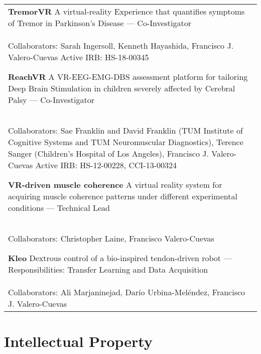 \documentclass[10pt,a4paper]{article}
\begin{document}
  \vspace*{1mm}
  \begin{tabularx}{17cm}{X}
  \textbf{TremorVR} A virtual-reality Experience that quantifies symptoms of Tremor in Parkinson's Disease --- Co-Investigator\\
  Collaborators: Sarah Ingersoll, Kenneth Hayashida, Francisco J. Valero-Cuevas
  Active IRB: HS-18-00345


  \vspace*{3mm}
  \textbf{ReachVR} A VR-EEG-EMG-DBS assessment platform for tailoring Deep Brain Stimulation in children severely affected by Cerebral Palsy --- Co-Investigator\\
  Collaborators: Sae Franklin and David Franklin (TUM Institute of Cognitive Systems and TUM Neuromuscular Diagnostics), Terence Sanger (Children's Hospital of Los Angeles), Francisco J. Valero-Cuevas
  Active IRB: HS-12-00228, CCI-13-00324


  \vspace*{3mm}
  \textbf{VR-driven muscle coherence} A virtual reality system for acquiring muscle coherence patterns under different experimental conditions --- Technical Lead\\
  Collaborators: Christopher Laine, Francisco Valero-Cuevas




  \vspace*{3mm}
  \textbf{Kleo} Dextrous control of a bio-inspired tendon-driven robot --- Responsibilities: Transfer Learning and Data Acquisition\\
  Collaborators: Ali Marjaninejad, Dar\'{i}o Urbina-Mel\'{e}ndez, Francisco J. Valero-Cuevas


  \end{tabularx}


\vspace*{3mm}\section*{Intellectual Property}
\end{document}
